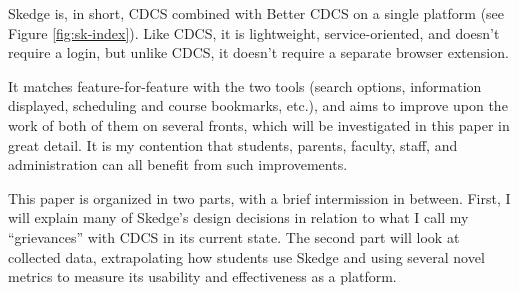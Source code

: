 Skedge \cite{skedge} is, in short, CDCS combined with Better CDCS on a single platform (see Figure \ref{fig:sk-index}). Like CDCS, it is lightweight, service-oriented, and doesn't require a login, but unlike CDCS, it doesn't require a separate browser extension.

It matches feature-for-feature with the two tools (search options, information displayed, scheduling and course bookmarks, etc.), and aims to improve upon the work of both of them on several fronts, which will be investigated in this paper in great detail. It is my contention that students, parents, faculty, staff, and administration can all benefit from such improvements.

\vspace{20pt}

\noindent
This paper is organized in two parts, with a brief intermission in between. First, I will explain many of Skedge's design decisions in relation to what I call my ``grievances'' with CDCS in its current state. The second part will look at collected data, extrapolating how students use Skedge and using several novel metrics to measure its usability and effectiveness as a platform.
